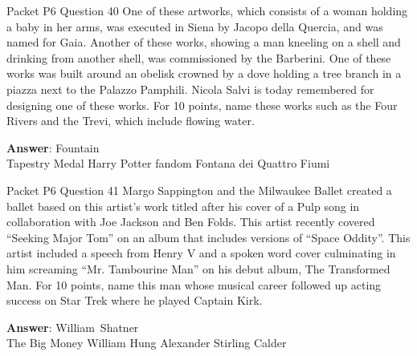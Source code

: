 \begin{frame}{Packet P6 Question 40}
One of these artworks,     which consists of a woman holding a baby in her arms, was executed in Siena by Jacopo della Quercia, and was named for Gaia. Another of these works, showing a man kneeling on a shell and drinking from another shell, was commissioned by the Barberini. One of these works was built around an obelisk crowned   by a dove holding a tree branch in a piazza next to the Palazzo Pamphili. Nicola Salvi is today remembered for designing one of these works. For 10 points,   name these works such as the Four Rivers and the Trevi, which include flowing water.  

\textbf{Answer}: Fountain\\
 Tapestry
 Medal
 Harry Potter fandom
 Fontana dei Quattro Fiumi
\end{frame}

\begin{frame}{Packet P6 Question 41}
Margo Sappington and the   Milwaukee Ballet created a ballet based on this artist's work titled after his cover of a Pulp song in collaboration with Joe Jackson and Ben Folds. This artist recently covered ``Seeking Major Tom'' on an album that includes versions of ``Space Oddity''. This artist included a speech from Henry V and a spoken word cover culminating in him screaming ``Mr. Tambourine Man'' on his debut   album, The Transformed Man. For 10 points, name this man whose musical career followed up acting   success on Star Trek where he played Captain   Kirk.  

\textbf{Answer}: William\ Shatner\\
 The Big Money
 William Hung
 Alexander Stirling Calder
\end{frame}

